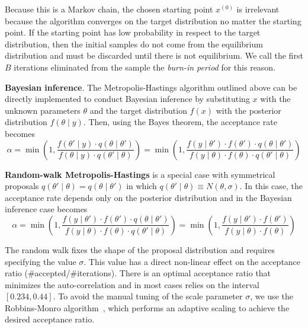 \documentclass[11pt,fleqn]{book} %
\begin{document}
Because this is a Markov chain, the chosen starting point $x^{(0)}$ is 
irrelevant because the algorithm converges on the target distribution
no matter the starting point. If the starting point has low probability 
in respect to the target distribution, then the initial samples do not 
come from the equilibrium distribution and must be discarded until there 
is not equilibrium. We call the first $B$ iterations eliminated from the 
sample the \emph{burn-in period} for this reason.

\textbf{Bayesian inference}.
The Metropolis-Hastings algorithm outlined above can be directly implemented 
to conduct Bayesian inference by substituting $x$ with the unknown parameters 
$\theta$ and the target distribution $f(x)$ with the posterior distribution 
$f(\theta \mid y)$. Then, using the Bayes theorem, the acceptance rate 
becomes
\begin{displaymath}
	\alpha = \min\left(1,\frac{f(\theta' \mid y) \cdot q(\theta \mid \theta')}{f(\theta \mid y) \cdot q(\theta' \mid \theta)}\right) = \min\left(1,\frac{f(y \mid \theta') \cdot f(\theta') \cdot q(\theta \mid \theta')}{f(y \mid \theta)  \cdot f(\theta) \cdot q(\theta' \mid \theta)}\right)
\end{displaymath}

\textbf{Random-walk Metropolis-Hastings} is a special case with symmetrical 
proposals $q(\theta' \mid \theta) = q(\theta \mid \theta')$ in which 
$q(\theta' \mid \theta) \equiv N(\theta,\sigma)$. 
In this case, the acceptance rate depends only on the posterior distribution
and in the Bayesian inference case becomes
\begin{displaymath}
	\alpha = 
	\min\left(1,\frac{f(y \mid \theta') \cdot f(\theta') \cdot q(\theta \mid \theta')}{f(y \mid \theta)  \cdot f(\theta) \cdot q(\theta' \mid \theta)}\right) = 
	\min\left(1,\frac{f(y \mid \theta') \cdot f(\theta')}{f(y \mid \theta) \cdot f(\theta)}\right)
\end{displaymath}

The random walk fixes the shape of the proposal distribution and requires 
specifying the value $\sigma$. This value has a direct non-linear effect 
on the acceptance ratio (\#accepted/\#iterations). There is an optimal 
acceptance ratio that minimizes the auto-correlation and in most cases 
relies on the interval $[0.234,0.44]$. To avoid the  manual tuning of the 
scale parameter $\sigma$, we use the Robbins-Monro algorithm~\cite{garthwaite:2010}, 
which performs an adaptive scaling to achieve the desired acceptance ratio.
\end{document}
